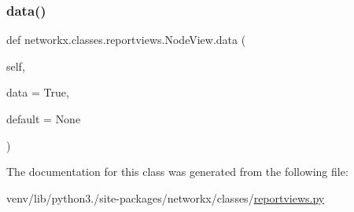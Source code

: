 \subsubsection{\texorpdfstring{data()}{data()}}
{\footnotesize\ttfamily def networkx.\+classes.\+reportviews.\+Node\+View.\+data (\begin{DoxyParamCaption}\item[{}]{self,  }\item[{}]{data = {\ttfamily True},  }\item[{}]{default = {\ttfamily None} }\end{DoxyParamCaption})}



The documentation for this class was generated from the following file\+:\begin{DoxyCompactItemize}
\item 
venv/lib/python3./site-\/packages/networkx/classes/\hyperlink{reportviews_8py}{reportviews.\+py}\end{DoxyCompactItemize}
